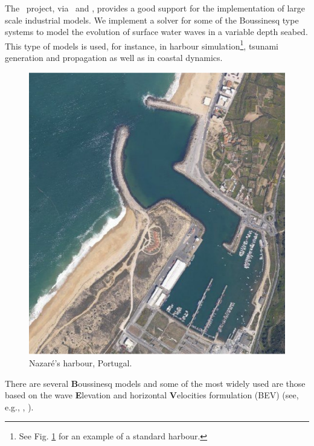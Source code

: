 The \fenics\, project, via \dolfin\, and \ffc, provides a good
support for the implementation of large scale industrial models.  We
implement a solver for some of the Boussinesq type systems to model
the evolution of surface water waves in a variable
depth seabed.  This type of models is used, for instance, in harbour
simulation\footnote{See Fig. \ref{lopes:fig:harbour} for an example of a
standard harbour.}, tsunami generation and propagation as well as in
coastal dynamics.
\begin{figure}[!htb]
\centering
\includegraphics[width=\smallwidth]{chapters/lopes/pdf/nazare1.pdf}
\caption{Nazar\'{e}'s harbour, Portugal.}\label{lopes:fig:harbour}
\end{figure}


There are several {\bf B}oussinesq models and some of the most widely
used are those based on the wave {\bf E}levation and horizontal {\bf
V}elocities formulation (BEV) (see, e.g., \cite{LiuWoo2004},
\cite{WalkleyBerzins2002}).

